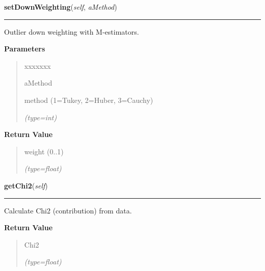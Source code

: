 \hspace{.8\funcindent}\begin{boxedminipage}{\funcwidth}

    \raggedright \textbf{setDownWeighting}(\textit{self}, \textit{aMethod})

    \vspace{-1.5ex}

    \rule{\textwidth}{0.5\fboxrule}
\setlength{\parskip}{2ex}
    Outlier down weighting with M-estimators.

\setlength{\parskip}{1ex}
      \textbf{Parameters}
      \vspace{-1ex}

      \begin{quote}
        \begin{Ventry}{xxxxxxx}

          \item[aMethod]

          method (1=Tukey, 2=Huber, 3=Cauchy)

            {\it (type=int)}

        \end{Ventry}

      \end{quote}

      \textbf{Return Value}
    \vspace{-1ex}

      \begin{quote}
      weight (0..1)

      {\it (type=float)}

      \end{quote}

    \end{boxedminipage}

    \label{gblfit:GblData:getChi2}

    \vspace{0.5ex}

\hspace{.8\funcindent}\begin{boxedminipage}{\funcwidth}

    \raggedright \textbf{getChi2}(\textit{self})

    \vspace{-1.5ex}

    \rule{\textwidth}{0.5\fboxrule}
\setlength{\parskip}{2ex}
    Calculate Chi2 (contribution) from data.

\setlength{\parskip}{1ex}
      \textbf{Return Value}
    \vspace{-1ex}

      \begin{quote}
      Chi2

      {\it (type=float)}

      \end{quote}

    \end{boxedminipage}

